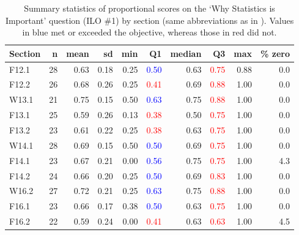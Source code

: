 \documentclass{article}\usepackage[]{graphicx}\usepackage[]{color}
\begin{document}
\begin{table}[h]
\centering
\caption{Summary statistics of proportional scores on the `Why Statistics is Important' question (ILO \#1) by section (same abbreviations as in ). Values in blue met or exceeded the objective, whereas those in red did not.} 
\label{tab:sumWhy}
\begin{tabular}{lrrrrrrrrr}
  \hline
Section & n & mean & sd & min & \textbf{Q1} & median & \textbf{Q3} & max & \% zero \\ 
  \hline
F12.1 & 28 & 0.63 & 0.18 & 0.25 & \textcolor{red}{\textcolor{blue}{0.50}} & 0.63 & \textcolor{red}{                   0.75} & 0.88 & 0.0 \\ 
  F12.2 & 26 & 0.68 & 0.26 & 0.25 & \textcolor{red}{                   0.41} & 0.69 & \textcolor{red}{                   0.88} & 1.00 & 0.0 \\ 
  W13.1 & 21 & 0.75 & 0.15 & 0.50 & \textcolor{red}{\textcolor{blue}{0.63}} & 0.75 & \textcolor{red}{                   0.88} & 1.00 & 0.0 \\ 
  F13.1 & 25 & 0.59 & 0.26 & 0.13 & \textcolor{red}{                   0.38} & 0.50 & \textcolor{red}{                   0.75} & 1.00 & 0.0 \\ 
  F13.2 & 23 & 0.61 & 0.22 & 0.25 & \textcolor{red}{                   0.38} & 0.63 & \textcolor{red}{                   0.75} & 1.00 & 0.0 \\ 
  W14.1 & 28 & 0.69 & 0.15 & 0.50 & \textcolor{red}{\textcolor{blue}{0.50}} & 0.69 & \textcolor{red}{                   0.75} & 1.00 & 0.0 \\ 
  F14.1 & 23 & 0.67 & 0.21 & 0.00 & \textcolor{red}{\textcolor{blue}{0.56}} & 0.75 & \textcolor{red}{                   0.75} & 1.00 & 4.3 \\ 
  F14.2 & 24 & 0.66 & 0.20 & 0.25 & \textcolor{red}{\textcolor{blue}{0.50}} & 0.69 & \textcolor{red}{                   0.83} & 1.00 & 0.0 \\ 
  W16.2 & 27 & 0.72 & 0.21 & 0.25 & \textcolor{red}{\textcolor{blue}{0.63}} & 0.75 & \textcolor{red}{                   0.88} & 1.00 & 0.0 \\ 
  F16.1 & 23 & 0.66 & 0.17 & 0.38 & \textcolor{red}{\textcolor{blue}{0.50}} & 0.63 & \textcolor{red}{                   0.75} & 1.00 & 0.0 \\ 
  F16.2 & 22 & 0.59 & 0.24 & 0.00 & \textcolor{red}{                   0.41} & 0.63 & \textcolor{red}{                   0.63} & 1.00 & 4.5 \\ 

\end{tabular}
\end{table}
\end{document}
